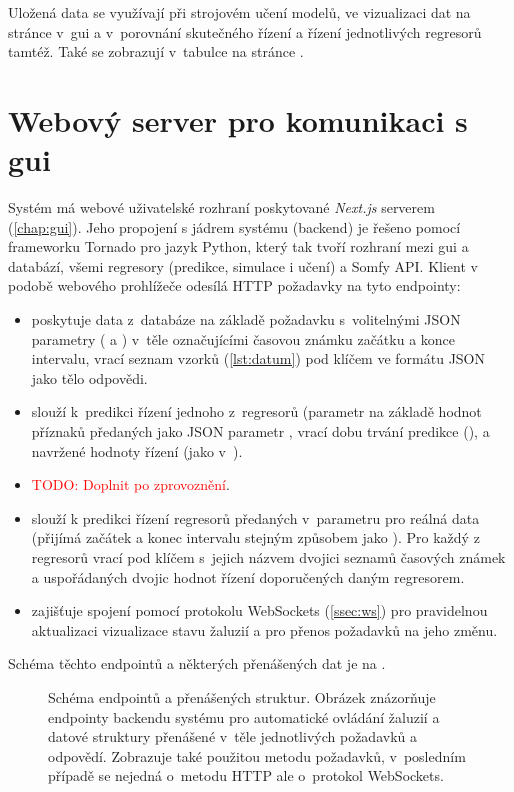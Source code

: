     Uložená data se využívají při strojovém učení modelů, ve vizualizaci dat na stránce  v~\acrshort{gui} a v~porovnání skutečného řízení a řízení jednotlivých regresorů tamtéž. Také se zobrazují v~tabulce na stránce .

  \section{Webový server pro komunikaci s \acrshort{gui}} \label{sec:tornado}
    Systém má webové uživatelské rozhraní poskytované \emph{Next.js} serverem (\cref{chap:gui}). Jeho propojení s jádrem systému (backend) je řešeno pomocí frameworku Tornado pro jazyk Python, který tak tvoří rozhraní mezi \acrshort{gui} a databází, všemi regresory (predikce, simulace i učení) a Somfy API. Klient v podobě webového prohlížeče odesílá HTTP požadavky na tyto endpointy: 
    \begin{itemize}
      \item {} poskytuje data z~databáze na základě  požadavku s~volitelnými JSON parametry ( a ) v~těle označujícími časovou známku začátku a konce intervalu, vrací seznam vzorků (\cref{lst:datum}) pod klíčem  ve formátu JSON jako tělo odpovědi.
      \item {} slouží k~predikci řízení jednoho z~regresorů (parametr  na základě hodnot příznaků předaných jako JSON parametr , vrací dobu trvání predikce (),  a navržené hodnoty řízení (jako v~).
      \item {} \textcolor{red}{TODO: Doplnit po zprovoznění}.
      \item {} slouží k predikci řízení regresorů předaných v~parametru  pro reálná data (přijímá začátek a konec intervalu stejným způsobem jako ). Pro každý z regresorů vrací pod klíčem s~jejich názvem dvojici seznamů časových známek a uspořádaných dvojic hodnot řízení doporučených daným regresorem.
      \item {} zajišťuje spojení pomocí protokolu WebSockets (\cref{ssec:ws}) pro pravidelnou aktualizaci vizualizace stavu žaluzií a pro přenos požadavků na jeho změnu.
    \end{itemize}
    Schéma těchto endpointů a některých přenášených dat je na .
    
    \begin{figure}
      \centering
      
      \caption[Schéma endpointů a přenášených struktur]{Schéma endpointů a přenášených struktur. Obrázek znázorňuje endpointy backendu systému pro automatické ovládání žaluzií a datové struktury přenášené v~těle jednotlivých  požadavků a odpovědí. Zobrazuje také použitou metodu požadavků, v~posledním případě se nejedná o~metodu HTTP ale o~protokol WebSockets.}
      \label{fig:endpoints}
    \end{figure}
